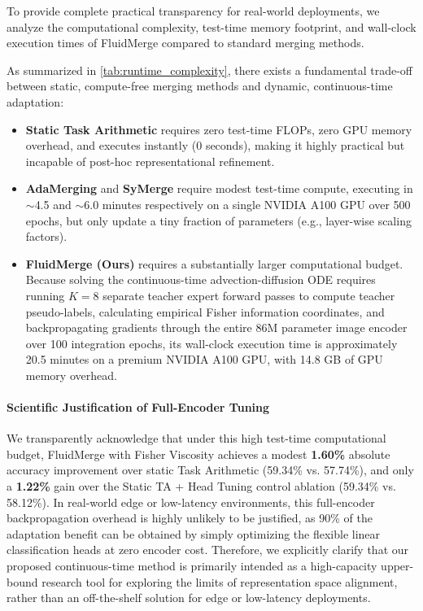 To provide complete practical transparency for real-world deployments, we analyze the computational complexity, test-time memory footprint, and wall-clock execution times of FluidMerge compared to standard merging methods. 

As summarized in \cref{tab:runtime_complexity}, there exists a fundamental trade-off between static, compute-free merging methods and dynamic, continuous-time adaptation:
\begin{itemize}
    \item \textbf{Static Task Arithmetic} requires zero test-time FLOPs, zero GPU memory overhead, and executes instantly ($0$ seconds), making it highly practical but incapable of post-hoc representational refinement.
    \item \textbf{AdaMerging} and \textbf{SyMerge} require modest test-time compute, executing in $\sim$4.5 and $\sim$6.0 minutes respectively on a single NVIDIA A100 GPU over 500 epochs, but only update a tiny fraction of parameters (e.g., layer-wise scaling factors).
    \item \textbf{FluidMerge (Ours)} requires a substantially larger computational budget. Because solving the continuous-time advection-diffusion ODE requires running $K=8$ separate teacher expert forward passes to compute teacher pseudo-labels, calculating empirical Fisher information coordinates, and backpropagating gradients through the entire 86M parameter image encoder over 100 integration epochs, its wall-clock execution time is approximately 20.5 minutes on a premium NVIDIA A100 GPU, with 14.8 GB of GPU memory overhead.
\end{itemize}

\paragraph{Scientific Justification of Full-Encoder Tuning}
We transparently acknowledge that under this high test-time computational budget, FluidMerge with Fisher Viscosity achieves a modest \textbf{1.60\%} absolute accuracy improvement over static Task Arithmetic (59.34\% vs. 57.74\%), and only a \textbf{1.22\%} gain over the Static TA + Head Tuning control ablation (59.34\% vs. 58.12\%). In real-world edge or low-latency environments, this full-encoder backpropagation overhead is highly unlikely to be justified, as 90\% of the adaptation benefit can be obtained by simply optimizing the flexible linear classification heads at zero encoder cost. Therefore, we explicitly clarify that our proposed continuous-time method is primarily intended as a high-capacity upper-bound research tool for exploring the limits of representation space alignment, rather than an off-the-shelf solution for edge or low-latency deployments.

